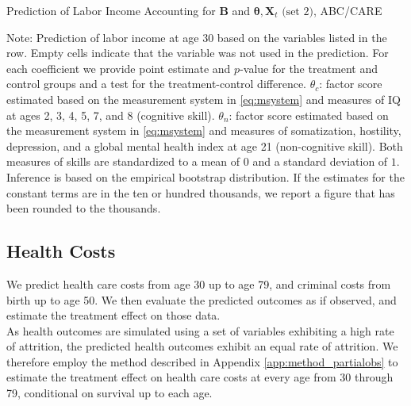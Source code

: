 \begin{table} 
\begin{threeparttable}
\caption{Prediction of Labor Income Accounting for $\bm{B}$ and $\bm{\theta}, \bm{X}_{t} \text{ (set 2)}$, ABC/CARE}
\label{table:predfac3}
\centering 
\footnotesize

\begin{tablenotes}
\footnotesize
\item Note: Prediction of labor income at age 30 based on the variables listed in the row. Empty cells indicate that the variable was not used in the prediction. For each coefficient we provide point estimate and $p$-value for the treatment and control groups and a test for the treatment-control difference. $\theta_{c}$: factor score estimated based on the measurement system in \eqref{eq:msystem} and measures of IQ at ages 2, 3, 4, 5, 7, and 8 (cognitive skill). $\theta_{n}$: factor score estimated based on the measurement system in \eqref{eq:msystem} and measures of somatization, hostility, depression, and a global mental health index at age 21 (non-cognitive skill). Both measures of skills are standardized to a mean of $0$ and a standard deviation of $1$. Inference is based on the empirical bootstrap distribution. If the estimates for the constant terms are in the ten or hundred thousands, we report a figure that has been rounded to the thousands.
\end{tablenotes}
\end{threeparttable}
\end{table}

\subsection{Health Costs}

\noindent We predict health care costs from age 30 up to age 79, and criminal costs from birth
up to age 50. We then evaluate the predicted outcomes as if observed, and estimate the
treatment effect on those data.\\

\noindent As health outcomes are simulated using a set of variables exhibiting a high rate of attrition, the
predicted health outcomes exhibit an equal rate of attrition. We therefore employ the method described
in Appendix \ref{app:method_partialobs} to estimate the treatment effect on health care costs at
every age from 30 through 79, conditional on survival up to each age. \\

